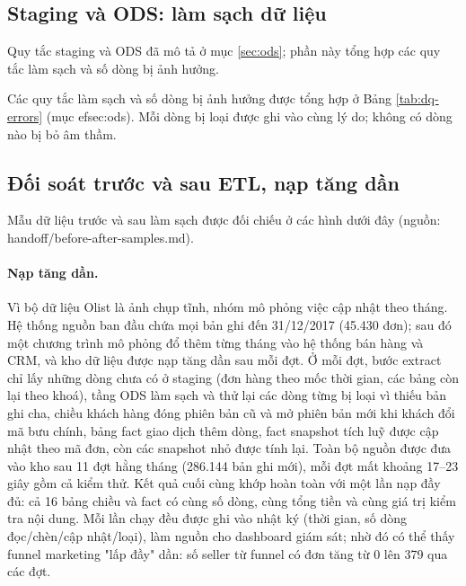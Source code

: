 \subsection{Staging và ODS: làm sạch dữ liệu}\label{sec:staging-ods}
Quy tắc staging và ODS đã mô tả ở mục \ref{sec:ods}; phần này tổng hợp các quy tắc làm sạch và số dòng bị ảnh hưởng.

Các quy tắc làm sạch và số dòng bị ảnh hưởng được tổng hợp ở Bảng \ref{tab:dq-errors} (mục 
ef{sec:ods}). Mỗi dòng bị loại được ghi vào  cùng lý do; không có dòng nào bị bỏ âm thầm.

\subsection{Đối soát trước và sau ETL, nạp tăng dần}\label{sec:doi-soat}
Mẫu dữ liệu trước và sau làm sạch được đối chiếu ở các hình dưới đây (nguồn: handoff/before-after-samples.md).
\paragraph{Nạp tăng dần.}
Vì bộ dữ liệu Olist là ảnh chụp tĩnh, nhóm mô phỏng việc cập nhật theo tháng. Hệ thống nguồn ban đầu chứa mọi bản ghi đến 31/12/2017 (45.430 đơn); sau đó một chương trình mô phỏng đổ thêm từng tháng vào hệ thống bán hàng và CRM, và kho dữ liệu được nạp tăng dần sau mỗi đợt. Ở mỗi đợt, bước extract chỉ lấy những dòng chưa có ở staging (đơn hàng theo mốc thời gian, các bảng còn lại theo khoá), tầng ODS làm sạch và thử lại các dòng từng bị loại vì thiếu bản ghi cha, chiều khách hàng đóng phiên bản cũ và mở phiên bản mới khi khách đổi mã bưu chính, bảng fact giao dịch thêm dòng, fact snapshot tích luỹ được cập nhật theo mã đơn, còn các snapshot nhỏ được tính lại. Toàn bộ nguồn được đưa vào kho sau 11 đợt hằng tháng (286.144 bản ghi mới), mỗi đợt mất khoảng 17–23 giây gồm cả kiểm thử. Kết quả cuối cùng khớp hoàn toàn với một lần nạp đầy đủ: cả 16 bảng chiều và fact có cùng số dòng, cùng tổng tiền và cùng giá trị kiểm tra nội dung. Mỗi lần chạy đều được ghi vào nhật ký  (thời gian, số dòng đọc/chèn/cập nhật/loại), làm nguồn cho dashboard giám sát; nhờ đó có thể thấy funnel marketing "lấp đầy" dần: số seller từ funnel có đơn tăng từ 0 lên 379 qua các đợt.

